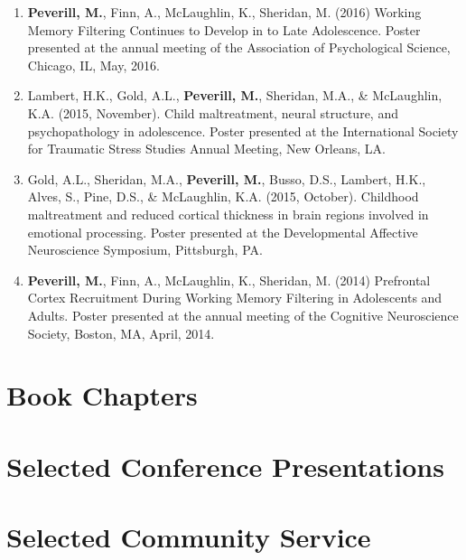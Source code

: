 \documentclass[12pt,letterpaper,roman]{moderncv}        %
\begin{document}
\begin{enumerate}
	\item \textbf{Peverill, M.}, Finn, A., McLaughlin, K., Sheridan, M. (2016) Working Memory Filtering Continues to Develop in to Late Adolescence. Poster presented at the annual meeting of the Association of Psychological Science, Chicago, IL, May, 2016. 

	\item Lambert, H.K., Gold, A.L., \textbf{Peverill, M.}, Sheridan, M.A., \& McLaughlin, K.A. (2015, November). Child maltreatment, neural structure, and psychopathology in adolescence. Poster presented at the International Society for Traumatic Stress Studies Annual Meeting, New Orleans, LA.

	\item Gold, A.L., Sheridan, M.A., \textbf{Peverill, M.}, Busso, D.S., Lambert, H.K., Alves, S., Pine, D.S., \& McLaughlin, K.A. (2015, October). Childhood maltreatment and reduced cortical thickness in brain regions involved in emotional processing. Poster presented at the Developmental Affective Neuroscience Symposium, Pittsburgh, PA.

	\item \textbf{Peverill, M.}, Finn, A., McLaughlin, K., Sheridan, M. (2014) Prefrontal Cortex Recruitment During Working Memory Filtering in Adolescents and Adults. Poster presented at the annual meeting of the Cognitive Neuroscience Society, Boston, MA, April, 2014.

\end{enumerate}


\section{Book Chapters}

\section{Selected Conference Presentations}

\section{Selected Community Service}
	\cvitem{}
\end{document}
